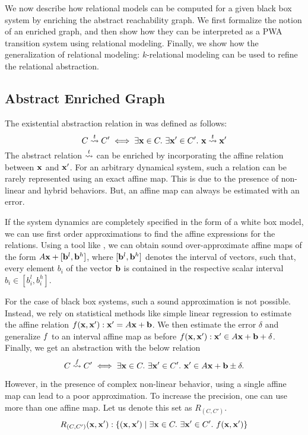 
We now describe how relational models can be computed for a given
black box system by enriching the abstract reachability graph. We
first formalize the notion of an enriched graph, and then show how
they can be interpreted as a PWA transition system using relational
modeling. Finally, we show how the generalization of relational
modeling: $k$-relational modeling can be used to refine the relational
abstraction.

\subsection{Abstract Enriched Graph}

The existential abstraction relation in \cite{zutshi2014multiple} was defined as
follows:
\[
    C \overset{t}{\rightsquigarrow} C' \iff \exists \mathbf{x} \in C.\ \exists \mathbf{x}' \in C'.\ \mathbf{x} \overset{t}{\rightsquigarrow} \mathbf{x}'
\]
The abstract relation $\overset{t}{\rightsquigarrow}$ can be enriched by incorporating
the affine relation between $\mathbf{x}$ and $\mathbf{x}'$. For an arbitrary dynamical
system, such a relation can be rarely represented using an exact affine map.
This is due to the presence of non-linear and hybrid behaviors. But,
an affine map can always be estimated with an error.

If the system dynamics are completely specified in the form of a white
box model, we can use first order approximations to find the affine
expressions for the relations. Using a tool like \flowstar, we can
obtain sound over-approximate affine maps of the form $A\mathbf{x} + [\mathbf{b}^l,
\mathbf{b}^h]$, where $[\mathbf{b}^l,\mathbf{b}^h]$ denotes the interval of vectors, such
that, every element $b_i$ of the vector $\mathbf{b}$ is contained in the
respective scalar interval $b_i\in[b^l_i,b^h_i]$.

For the case of black box systems, such a sound approximation is not
possible. Instead, we rely on statistical methods like simple linear
regression to estimate the affine relation $f(\mathbf{x},\mathbf{x}'): \mathbf{x}'=A\mathbf{x} + \mathbf{b}$. We then
estimate the error $\delta$ and generalize $f$ to an interval
affine map as before $f(\mathbf{x},\mathbf{x}'): \mathbf{x}' \in A\mathbf{x} + \mathbf{b} + \delta$.  Finally, we get an
abstraction with the below relation
\[
    C \overset{f}{\rightsquigarrow} C' \iff \exists \mathbf{x} \in C.\ \exists \mathbf{x}' \in C'.\ \mathbf{x}' \in A\mathbf{x} + \mathbf{b} \pm \delta.
\]

However, in the presence of complex non-linear behavior, using a
single affine map can lead to a poor approximation. To increase the
precision, one can use more than one affine map. Let us denote this set as
$R_{(C,C')}$.%
\[
    R_{(C,C')}(\mathbf{x},\mathbf{x}'): \{(\mathbf{x},\mathbf{x}') \;|\; \exists \mathbf{x} \in C.\ \exists \mathbf{x}' \in C'.\ f(\mathbf{x},\mathbf{x}')\}
\]

